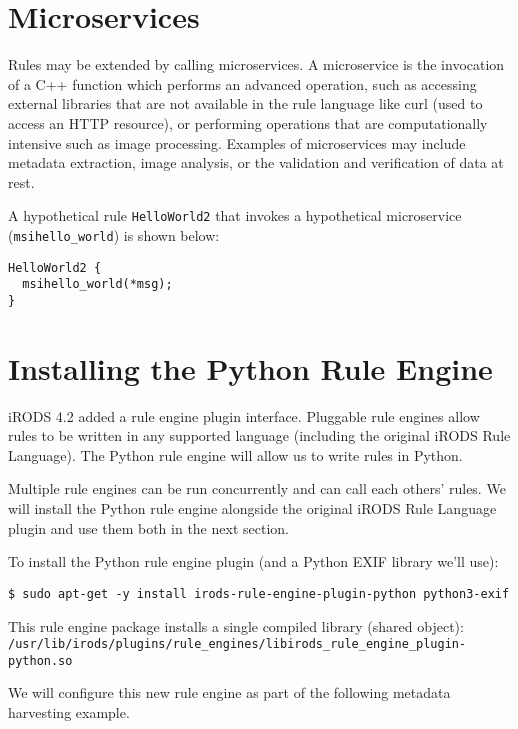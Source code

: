 \documentclass[10pt,oneside]{memoir}
\begin{document}
\section{Microservices}

Rules may be extended by calling microservices. A microservice is the invocation of a C++ function which performs an advanced operation, such as accessing external libraries that are not available in the rule language like curl (used to access an HTTP resource), or performing operations that are computationally intensive such as image processing. Examples of microservices may include metadata extraction, image analysis, or the validation and verification of data at rest.

A hypothetical rule \texttt{HelloWorld2} that invokes a hypothetical microservice (\texttt{msihello\_world}) is shown below:

\begin{lstlisting}
HelloWorld2 {
  msihello_world(*msg);
}
\end{lstlisting}

\section{Installing the Python Rule Engine}

iRODS 4.2 added a rule engine plugin interface.  Pluggable rule engines allow rules to be written in any supported language (including the original iRODS Rule Language).  The Python rule engine will allow us to write rules in Python.

Multiple rule engines can be run concurrently and can call each others' rules.  We will install the Python rule engine alongside the original iRODS Rule Language plugin and use them both in the next section.

To install the Python rule engine plugin (and a Python EXIF library we'll use):

\begin{lstlisting}
$ sudo apt-get -y install irods-rule-engine-plugin-python python3-exif
\end{lstlisting}

This rule engine package installs a single compiled library (shared object): \\ \texttt{/usr/lib/irods/plugins/rule\_engines/libirods\_rule\_engine\_plugin-python.so}

We will configure this new rule engine as part of the following metadata harvesting example.
\end{document}

